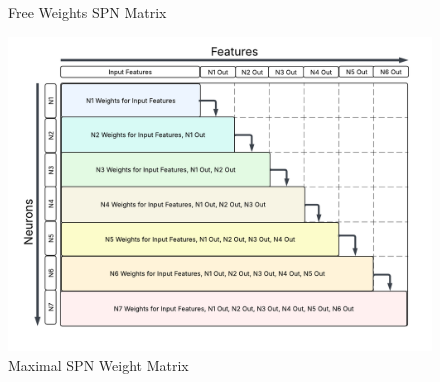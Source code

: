 \begin{figure}[H]
\begin{minipage}{0.45\textwidth}
        \captionsetup{width=\linewidth}
        \caption{Free Weights SPN Matrix}
        \label{fig:fwSPNWeights}
    \end{minipage}
    \begin{minipage}{0.7\textwidth}
        \centering
        \includegraphics[height=0.3\textheight, width=\linewidth]{Figures/Experiments/Neuron_Based_Maximal_SPN_Weights.png} %
        \captionsetup{width=\linewidth}
        \caption{Maximal SPN Weight Matrix}
        \label{fig:MaxSPNWeights}
    \end{minipage}\hfill
\end{figure}

